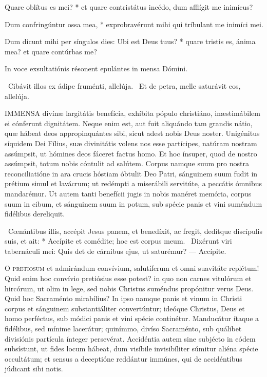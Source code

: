 Quare oblítus es mei? * et quare contristátus incédo, dum afflígit me inimícus?

Dum confringúntur ossa mea, * exprobravérunt mihi qui tríbulant me inimíci mei.

Dum dicunt mihi per síngulos dies: Ubi est Deus tuus? * quare tristis es, ánima mea? et quare contúrbas me?

 In voce exsultatiónis résonent epulántes in mensa Dómini.

\V\ Cibávit illos ex ádipe fruménti, allelúja. \R\ Et de petra, melle saturávit eos, allelúja.



\lettrine[lines=2]{I}{MMENSA} divínæ largitátis benefícia, exhíbita pópulo christiáno, inæstimábilem ei cónferunt dignitátem. Neque enim est, aut fuit aliquándo tam grandis nátio, quæ hábeat deos appropinquántes sibi, sicut adest nobis Deus noster. Unigénitus síquidem Dei Fílius, suæ divinitátis volens nos esse partícipes, natúram nostram assúmpsit, ut hómines deos fáceret factus homo. Et hoc ínsuper, quod de nostro assúmpsit, totum nobis cóntulit ad salútem. Corpus namque suum pro nostra reconciliatióne in ara crucis hóstiam óbtulit Deo Patri, sánguinem suum fudit in prétium simul et lavácrum; ut redémpti a miserábili servitúte, a peccátis ómnibus mandarémur. Ut autem tanti benefícii jugis in nobis manéret memória, corpus suum in cibum, et sánguinem suum in potum, sub spécie panis et vini suméndum fidélibus dereliquit.

\R\ Cœnántibus illis, accépit Jesus panem, et benedíxit, ac fregit, dedítque discípulis suis, et ait: * Accípite et comédite; hoc est corpus meum. \V\ Dixérunt viri tabernáculi mei: Quis det de cárnibus ejus, ut saturémur? --- Accípite.


\lettrine[lines=2]{O}{} \textsc{pretiosum} et admirándum convívium, salutíferum et omni suavitáte replétum! Quid enim hoc convívio pretiósius esse potest? in quo non carnes vitulórum et hircórum, ut olim in lege, sed nobis Christus suméndus propónitur verus Deus. Quid hoc Sacraménto mirabílius? In ipso namque panis et vinum in Christi corpus et sánguinem substantiáliter convertúntur; ideóque Christus, Deus et homo perféctus, sub módici panis et vini spécie continétur. Manducátur ítaque a fidélibus, sed mínime lacerátur; quinímmo, divíso Sacraménto, sub quálibet divisiónis partícula ínteger persevérat. Accidéntia autem sine subjécto in eódem subsístunt, ut fides locum hábeat, dum visíbile invisibíliter súmitur aliéna spécie occultátum; et sensus a deceptióne reddántur immúnes, qui de accidéntibus júdicant sibi notis.

